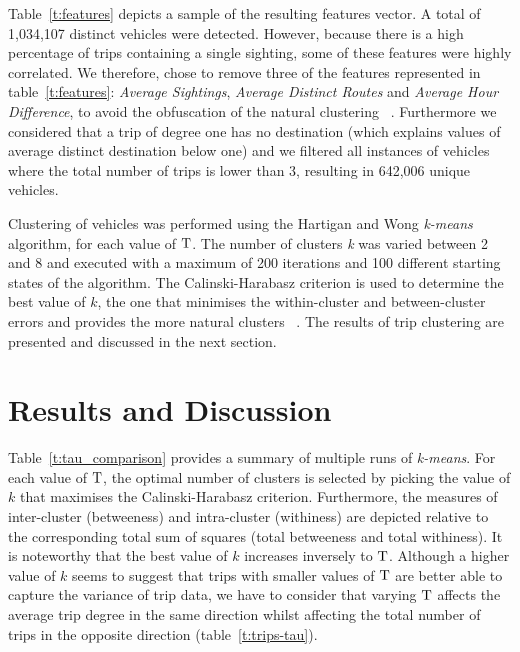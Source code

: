 Table~\ref{t:features} depicts a sample of the resulting features vector. A total of 1,034,107 distinct vehicles were detected. However, because there is a high percentage of trips containing a single sighting, some of these features were highly correlated. We therefore, chose to remove three of the features represented in table~\ref{t:features}: \emph{Average Sightings}, \emph{Average Distinct Routes} and \emph{Average Hour Difference}, to avoid the obfuscation of the natural clustering ~\cite{Kmeans}. Furthermore we considered that a trip of degree one has no destination (which explains values of average distinct destination below one) and we filtered all instances of vehicles where the total number of trips is lower than 3, resulting in 642,006 unique vehicles.

Clustering of vehicles was performed using the Hartigan and Wong \emph{k-means} algorithm, for each value of $\mathrm{T}$. The number of clusters \emph{k} was varied between 2 and 8 and executed with a maximum of 200 iterations and 100 different starting states of the algorithm. The Calinski-Harabasz criterion is used to determine the best value of $k$, the one that minimises the within-cluster and between-cluster errors and provides the more natural clusters ~\cite{Kmeans}. The results of trip clustering are presented and discussed in the next section.

\section{Results and Discussion}\label{s.results}

Table~\ref{t:tau_comparison} provides a summary of multiple runs of \emph{k-means}. For each value of $\mathrm{T}$, the optimal number of clusters is selected by picking the value of $k$ that maximises the Calinski-Harabasz criterion. Furthermore, the measures of inter-cluster (betweeness) and intra-cluster (withiness) are depicted relative to the corresponding total sum of squares (total betweeness and total withiness). It is noteworthy that the best value of $k$ increases inversely to $\mathrm{T}$. Although a higher value of $k$ seems to suggest that trips with smaller values of $\mathrm{T}$ are better able to capture the variance of trip data, we have to consider that varying $\mathrm{T}$ affects the average trip degree in the same direction whilst affecting the total number of trips in the opposite direction (table~\ref{t:trips-tau}).


